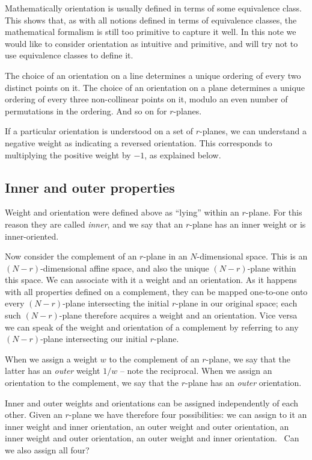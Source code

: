 \documentclass[\ifafour a4paper,12pt,\else a5paper,10pt,\fi%
onecolumn,oneside,article,%
british%
]{memoir}
\theoremstyle{remark}
\theoremstyle{innote}
\renewcommand*{\|}{\nonscript\,\vert\nonscript\;\mathopen{}}
\newcommand*{\puzzle}{{\fontencoding{U}\fontfamily{fontawesometwo}\selectfont\symbol{225}}}
\newcommand{\mynote}[1]{ {\color{notecolour}\puzzle\ #1}}
\newcommand*{\yr}{r}
\newcommand*{\yN}{N}
\newcommand*{\yw}{w}
\begin{document}
Mathematically orientation is usually defined in terms of some equivalence
class. This shows that, as with all notions defined in terms of equivalence
classes, the mathematical formalism is still too primitive to capture it
well. In this note we would like to consider orientation as intuitive and
primitive, and will try not to use equivalence classes to define it.

The choice of an orientation on a line determines a unique ordering of
every two distinct points on it. The choice of an orientation on a plane
determines a unique ordering of every three non-collinear points on it,
modulo an even number of permutations in the ordering. And so on for
$\yr$-planes.

If a particular orientation is understood on a set of $\yr$-planes, we can
understand a negative weight as indicating a reversed orientation. This
corresponds to multiplying the positive weight by $-1$, as explained below.


\subsection{Inner and outer properties}
\label{sec:inner_outer_properties}

Weight and orientation were defined above as \enquote{lying} within an
$\yr$-plane. For this reason they are called \emph{inner}, and we say that
an $\yr$-plane has an inner weight or is inner-oriented.

Now consider the complement of an $\yr$-plane in an $\yN$-dimensional
space. This is an $(\yN-\yr)$-dimensional affine space, and also the unique
$(\yN-\yr)$-plane within this space. We can associate with it a weight and an
orientation. As it happens with all properties defined on a complement, they
can be mapped one-to-one onto every $(\yN-\yr)$-plane intersecting the
initial $\yr$-plane in our original space; each such $(\yN-\yr)$-plane
therefore acquires a weight and an orientation. Vice versa we can
speak of the weight and orientation of a complement by referring to any
$(\yN-\yr)$-plane intersecting our initial $\yr$-plane.

When we assign a weight $\yw$ to the complement of an $\yr$-plane, we say
that the latter has an \emph{outer} weight $1/\yw$ -- note the reciprocal.
When we assign an orientation to the complement, we say that the
$\yr$-plane has an \emph{outer} orientation.

Inner and outer weights and orientations can be assigned independently of
each other. Given an $\yr$-plane we have therefore four possibilities: we
can assign to it an inner weight and inner orientation, an outer weight and
outer orientation, an inner weight and outer orientation, an outer weight
and inner orientation. \mynote{Can we also assign all four?}
\end{document}

